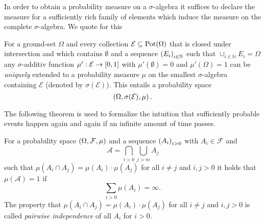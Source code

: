 In order to obtain a probability measure on a $\sigma$-algebra it suffices to
declare the measure for a sufficiently rich family of elements which induce the
measure on the complete $\sigma$-algebra. We quote for this
\begin{theorem}
  \cite[Theorem 2.4, Theorem 5.6]{Bauer}
  For a ground-set $\Omega$ and every collection
  $\mathcal{E}\subseteq\operatorname{Pot}(\Omega)$ that is closed under intersection and
  which contains $\emptyset$ and a sequence $\left(E_{i}\right)_{i\in\mathbb{N}}$ 
  such that $\cup_{i\in\mathbb{N}}E_{i} = \Omega$ any $\sigma$-additiv function
  $\mu':\mathcal{E}\rightarrow\left[0, 1\right]$
  with $\mu'(\emptyset) = 0$ and $\mu'(\Omega) = 1$ can be \emph{uniquely}
  extended to a probability measure $\mu$ on the smallest $\sigma$-algebra
  containing $\mathcal{E}$ (denoted by $\sigma(\mathcal{E})$). This entails a
  probability space
  \begin{equation*}
    \left(\Omega, \sigma(\mathcal{E}), \mu\right).
  \end{equation*}
  \label{thm:measureext}
\end{theorem}

The following theorem is used to formalize the intuition that sufficiently
probable events happen again and again if an infinite amount of time passes.
\begin{theorem}
  \cite[Theorem 2.7]{Klenke}
  For a probability space $\left(\Omega, \mathcal{F}, \mu\right)$ and a sequence 
  $\left(A_{i}\right)_{i>0}$ with $A_{i}\in\mathcal{F}$ and
  \begin{equation*}
    \mathcal{A} = \bigcap_{i > 0}\bigcup_{j > m}A_{j}
  \end{equation*}
  such that $\mu(A_{i}\cap A_{j}) = \mu(A_{i})\cdot\mu(A_{j})$ for all 
  $i \neq j$ and $i,j > 0$ it holds that $\mu(\mathcal{A}) = 1$ if
  \begin{equation*}
    \sum\limits_{i>0}\mu(A_{i}) = \infty.
  \end{equation*}
  The property that $\mu(A_{i}\cap A_{j}) = \mu(A_{i})\cdot\mu(A_{j})$ for 
  all $i \neq j$ and $i,j > 0$ is called \emph{pairwise independence} of 
  all $A_{i}$ for $i > 0$.
  \label{thm:BorelCantelli}
\end{theorem}

